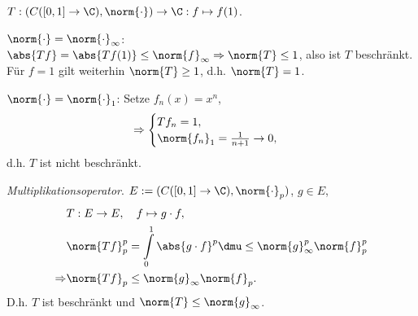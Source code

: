 \begin{bsp}
\label{bsp:2.4}
\begin{bspenum}
  \item $T: (C([0,1]\to\C),\norm{\cdot}) \to \C : f\mapsto f(1)$.
\begin{propenum}
  \item $\norm{\cdot} = \norm{\cdot}_\infty$: $\abs{Tf} = \abs{Tf(1)} \le
  \norm{f}_\infty \Rightarrow \norm{T} \le 1$, also ist $T$ beschränkt. Für
  $f=1$ gilt weiterhin $\norm{T} \ge 1$, d.h. $\norm{T}=1$.
  \item $\norm{\cdot} = \norm{\cdot}_1$: Setze $f_n(x) = x^n$,
\begin{align*}
\Rightarrow \begin{cases} Tf_n = 1,\\ \norm{f_n}_1 = \frac{1}{n+1}\to
0,\end{cases}
\end{align*}
d.h. $T$ ist nicht beschränkt.
\end{propenum}
\item \textit{Multiplikationsoperator}. $E:=(C([0,1]\to\C),\norm{\cdot}_p)$,
$g\in E$,
\begin{align*}
&T: E\to E,\quad f\mapsto g\cdot f,\\
&\norm{Tf}_p^p = \int\limits_0^1 \abs{g\cdot f}^p\dmu \le \norm{g}_\infty^p
\norm{f}_p^p\\
\Rightarrow & \norm{Tf}_p \le \norm{g}_\infty\norm{f}_p.
\end{align*}
D.h. $T$ ist beschränkt und $\norm{T}\le \norm{g}_\infty$.


\end{bspenum}
\end{bsp}
